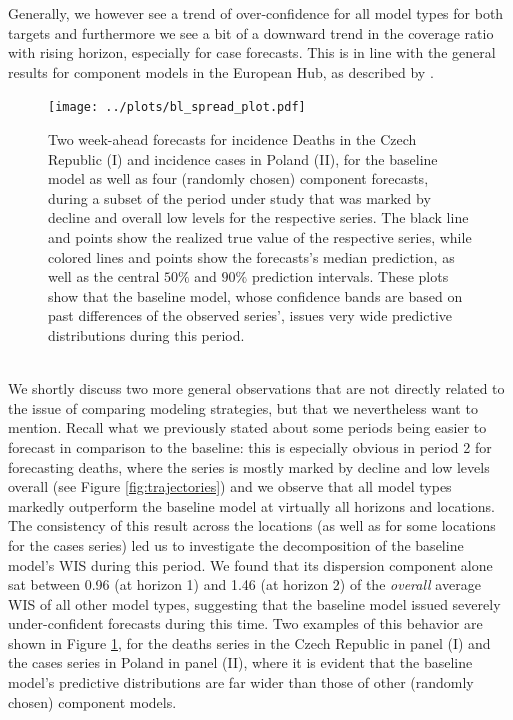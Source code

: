 Generally, we however see a trend of over-confidence for all model types for both targets and furthermore we see a bit of a downward trend in the coverage ratio with rising horizon, especially for case forecasts. This is in line with the general results for component models in the European Hub, as described by \cite{sherratt_european_2022}.
\begin{figure}
\centering
\texttt{[image: ../plots/bl\_spread\_plot.pdf]}
\caption{Two week-ahead forecasts for incidence Deaths in the Czech Republic (I) and incidence cases in Poland (II), for the baseline model as well as four (randomly chosen) component forecasts, during a subset of the period under study that was marked by decline and overall low levels for the respective series. The black line and points show the realized true value of the respective series, while colored lines and points show the forecasts's median prediction, as well as the central $50\%$ and $90\%$ prediction intervals. These plots show that the baseline model, whose confidence bands are based on past differences of the observed series', issues very wide predictive distributions during this period.}
\label{fig:blspread}
\end{figure}\medskip\\ 
We shortly discuss two more general observations that are not directly related to the issue of comparing modeling strategies, but that we nevertheless want to mention. Recall what we previously stated about some periods being easier to forecast in comparison to the baseline: this is especially obvious in period 2 for forecasting deaths, where the series is mostly marked by decline and low levels overall (see Figure \ref{fig:trajectories}) and we observe that all model types markedly outperform the baseline model at virtually all horizons and locations. The consistency of this result across the locations (as well as for some locations for the cases series) led us to investigate the decomposition of the baseline model's WIS during this period. We found that its dispersion component alone sat between 0.96 (at horizon 1) and 1.46 (at horizon 2) of the \textit{overall} average WIS of all other model types, suggesting that the baseline model issued severely under-confident forecasts during this time. Two examples of this behavior are shown in Figure \ref{fig:blspread}, for the deaths series in the Czech Republic in panel (I) and the cases series in Poland in panel (II), where it is evident that the baseline model's predictive distributions are far wider than those of other (randomly chosen) component models.  %
